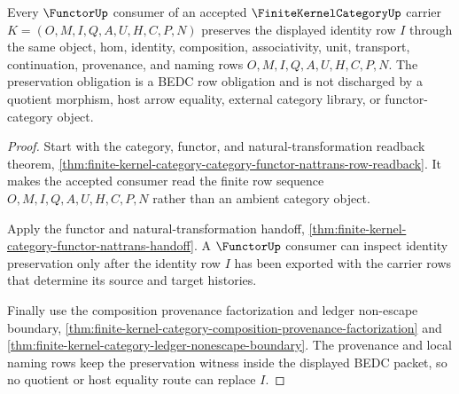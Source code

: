 \begin{theorem}
\label{thm:finite-kernel-category-functor-identity-preservation}
Every $\FunctorUp$ consumer of an accepted $\FiniteKernelCategoryUp$ carrier
$K=(O,M,I,Q,A,U,H,C,P,N)$ preserves the displayed identity row $I$ through the
same object, hom, identity, composition, associativity, unit, transport,
continuation, provenance, and naming rows $O,M,I,Q,A,U,H,C,P,N$. The
preservation obligation is a BEDC row obligation and is not discharged by a
quotient morphism, host arrow equality, external category library, or
functor-category object.
\end{theorem}
\begin{proof}
Start with the category, functor, and natural-transformation readback theorem,
\autoref{thm:finite-kernel-category-category-functor-nattrans-row-readback}.
It makes the accepted consumer read the finite row sequence
$O,M,I,Q,A,U,H,C,P,N$ rather than an ambient category object.

Apply the functor and natural-transformation handoff,
\autoref{thm:finite-kernel-category-functor-nattrans-handoff}. A
$\FunctorUp$ consumer can inspect identity preservation only after the
identity row $I$ has been exported with the carrier rows that determine its
source and target histories.

Finally use the composition provenance factorization and ledger non-escape
boundary,
\autoref{thm:finite-kernel-category-composition-provenance-factorization} and
\autoref{thm:finite-kernel-category-ledger-nonescape-boundary}. The
provenance and local naming rows keep the preservation witness inside the
displayed BEDC packet, so no quotient or host equality route can replace $I$.
\end{proof}

